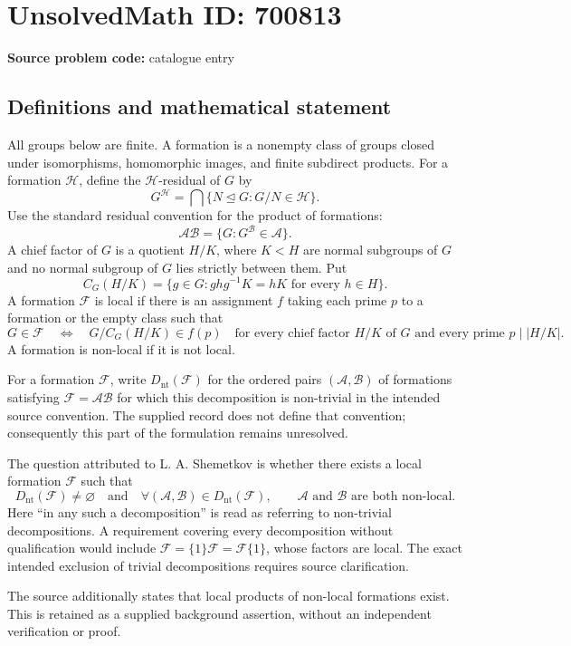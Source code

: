 \documentclass[11pt]{article}
\begin{document}
\section*{UnsolvedMath ID: 700813}
\textbf{Source problem code:} catalogue entry
\subsection{Definitions and mathematical statement}
All groups below are finite. A formation is a nonempty class of groups closed under isomorphisms, homomorphic images, and finite subdirect products. For a formation \(\mathcal H\), define the \(\mathcal H\)-residual of \(G\) by
\[
G^{\mathcal H}=\bigcap\{N\trianglelefteq G:G/N\in\mathcal H\}.
\]
Use the standard residual convention for the product of formations:
\[
\mathcal A\mathcal B=\{G:G^{\mathcal B}\in\mathcal A\}.
\]
A chief factor of \(G\) is a quotient \(H/K\), where \(K<H\) are normal subgroups of \(G\) and no normal subgroup of \(G\) lies strictly between them. Put
\[
C_G(H/K)=\{g\in G:ghg^{-1}K=hK\text{ for every }h\in H\}.
\]
A formation \(\mathcal F\) is local if there is an assignment \(f\) taking each prime \(p\) to a formation or the empty class such that
\[
G\in\mathcal F
\quad\Longleftrightarrow\quad
G/C_G(H/K)\in f(p)
\quad\text{for every chief factor }H/K\text{ of }G
\text{ and every prime }p\mid |H/K|.
\]
A formation is non-local if it is not local.

For a formation \(\mathcal F\), write \(D_{\mathrm{nt}}(\mathcal F)\) for the ordered pairs \((\mathcal A,\mathcal B)\) of formations satisfying \(\mathcal F=\mathcal A\mathcal B\) for which this decomposition is non-trivial in the intended source convention. The supplied record does not define that convention; consequently this part of the formulation remains unresolved.

The question attributed to L. A. Shemetkov is whether there exists a local formation \(\mathcal F\) such that
\[
D_{\mathrm{nt}}(\mathcal F)\ne\varnothing
\quad\text{and}\quad
\forall(\mathcal A,\mathcal B)\in D_{\mathrm{nt}}(\mathcal F),\qquad
\mathcal A\text{ and }\mathcal B\text{ are both non-local}.
\]
Here ``in any such a decomposition'' is read as referring to non-trivial decompositions. A requirement covering every decomposition without qualification would include \(\mathcal F=\{1\}\mathcal F=\mathcal F\{1\}\), whose factors are local. The exact intended exclusion of trivial decompositions requires source clarification.

The source additionally states that local products of non-local formations exist. This is retained as a supplied background assertion, without an independent verification or proof.
\end{document}
